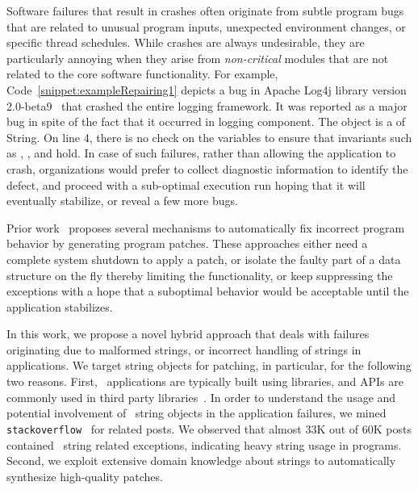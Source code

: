 Software failures that result in crashes often originate from subtle program
bugs that are related to unusual program inputs, unexpected environment changes,
or specific thread schedules. While crashes are always undesirable, they are
particularly annoying when they arise from \textit{non-critical} modules that
are not related to the core software functionality. For example,
Code~\ref{snippet:exampleRepairing1} depicts a bug in Apache Log4j library
version 2.0-beta9~\cite{ApacheLog4jBug} that crashed the entire logging
framework. It was reported as a major bug in spite of the fact that it occurred
in logging component. The object  is a  of
String. On line 4, there is no check on the variables to ensure that invariants
such as , , and
 hold.
%
In case of such failures, rather than allowing the application to crash,
organizations would prefer to collect diagnostic information to identify the
defect, and proceed with a sub-optimal execution run hoping that it will
eventually stabilize, or reveal a few more bugs.


Prior work~\cite{wei-issta-2010, Carbin:2011, conf/sosp/PerkinsKLABCPSSSWZER09,
conf/pldi/LongSR14} proposes several mechanisms to automatically fix incorrect
program behavior by generating program patches. These approaches either need a
complete system shutdown to apply a patch, or isolate the faulty part of a data
structure on the fly thereby limiting the functionality, or keep suppressing the
exceptions with a hope that a suboptimal behavior would be acceptable until the
application stabilizes.

In this work, we propose a novel hybrid approach that deals with failures
originating due to malformed strings, or incorrect handling of strings in \java\
applications. We target string objects for patching, in particular, for the
following two reasons.
First, \java\ applications are typically built using libraries, and
\code{String} APIs are commonly used in third party
libraries~\cite{Kawachiya:2008:ARM:1449764.1449795, gc, techreport}.  In
order to understand the usage and potential involvement of \java\ string
objects in the application failures, we mined
\texttt{stackoverflow}~\cite{stackoverflow} for related posts. We observed that
almost $33$K out of $60$K posts contained \java\ string related exceptions,
indicating heavy string usage in programs.
Second, we exploit extensive domain knowledge about strings to
automatically synthesize high-quality patches.

